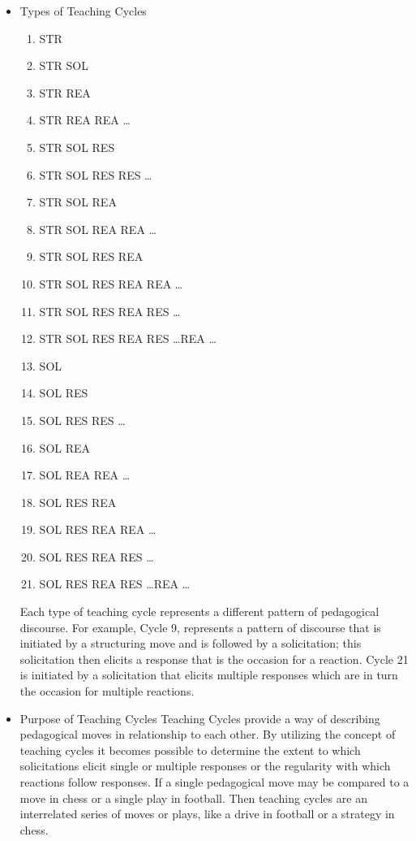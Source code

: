 \documentclass[10pt, letterpaper]{article}
\begin{document}
\begin{itemize}
\item Types of Teaching Cycles
\label{sec:org353244a}
\begin{enumerate}
\item STR
\item STR SOL
\item STR REA
\item STR REA REA \ldots
\item STR SOL RES
\item STR SOL RES RES \ldots
\item STR SOL REA
\item STR SOL REA REA \ldots
\item STR SOL RES REA
\item STR SOL RES REA REA \ldots
\item STR SOL RES REA RES \ldots
\item STR SOL RES REA RES \ldots REA \ldots
\item SOL
\item SOL RES
\item SOL RES RES \ldots
\item SOL REA
\item SOL REA REA \ldots
\item SOL RES REA
\item SOL RES REA REA \ldots
\item SOL RES REA RES \ldots
\item SOL RES REA RES \ldots REA \ldots
\end{enumerate}

Each type of teaching cycle represents a different pattern of pedagogical discourse. For example, Cycle 9, represents a pattern of discourse that is initiated by a structuring move and is followed by a solicitation; this solicitation then elicits a response that is the occasion for a reaction. Cycle 21 is initiated by a solicitation that elicits multiple responses which are in turn the occasion for multiple reactions. 
\item Purpose of Teaching Cycles
\label{sec:org952b30b}
Teaching Cycles provide a way of describing pedagogical moves in relationship to each other. By utilizing the concept of teaching cycles it becomes possible to determine the extent to which solicitations elicit single or multiple responses or the regularity with which reactions follow responses. If a single pedagogical move may be compared to a move in chess or a single play in football. Then teaching cycles are an interrelated series of moves or plays, like a drive in football or a strategy in chess.
\end{itemize}
\end{document}

